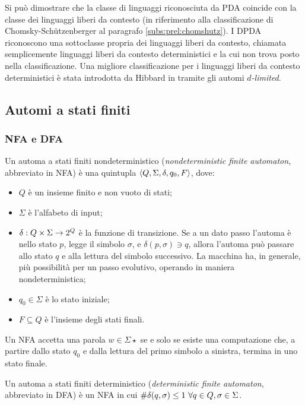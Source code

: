 Si può dimostrare che la classe di linguaggi riconosciuta da PDA coincide con la classe dei linguaggi liberi da contesto (in riferimento alla classificazione di Chomsky-Schützenberger al paragrafo \ref{subs:prel:chomshutz}). I DPDA riconoscono una sottoclasse propria dei linguaggi liberi da contesto, chiamata semplicemente linguaggi liberi da contesto deterministici e la cui non trova posto nella classificazione. Una migliore classificazione per i linguaggi liberi da contesto deterministici è stata introdotta da Hibbard in \cite{Hibbard:67:CFdet} tramite gli automi \emph{$d$-limited}.


\subsection{Automi a stati finiti}

\subsubsection{NFA e DFA}
\begin{defin}
	Un automa a stati finiti nondeterministico (\emph{nondeterministic finite automaton}, abbreviato in NFA) è una quintupla $\langle Q,\Sigma,\delta,q_0,F \rangle$, dove:
	\begin{itemize}
		\item $Q$ è un insieme finito e non vuoto di stati;
		\item $\Sigma$ è l'alfabeto di input;
		\item $\delta:Q\times\Sigma\to2^{Q}$ è la funzione di transizione. Se a un dato passo l'automa è nello stato $p$, legge il simbolo $\sigma$, e $\delta(p,\sigma)\ni q$, allora l'automa può passare allo stato $q$ e alla lettura del simbolo successivo. La macchina ha, in generale, più possibilità per un passo evolutivo, operando in maniera nondeterministica;
		\item $q_0\in\Sigma$ è lo stato iniziale;
		\item $F\subseteq Q$ è l'insieme degli stati finali.
	\end{itemize}
	Un NFA accetta una parola $w\in\Sigma\star$ se e solo se esiste una computazione che, a partire dallo stato $q_0$ e dalla lettura del primo simbolo a sinistra, termina in uno stato finale.
\end{defin}
\begin{defin}
	Un automa a stati finiti deterministico (\emph{deterministic finite automaton}, abbreviato in DFA) è un NFA in cui $\# \delta(q,\sigma)\leq 1 ~ \forall q\in Q,\sigma\in\Sigma$.
\end{defin}

